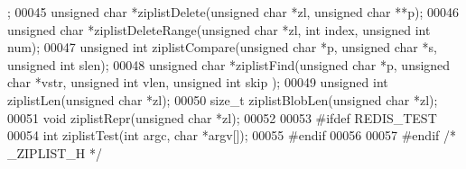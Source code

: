 \begin{DoxyCode}
      ;
00045 \textcolor{keywordtype}{unsigned} \textcolor{keywordtype}{char} *ziplistDelete(\textcolor{keywordtype}{unsigned} \textcolor{keywordtype}{char} *zl, \textcolor{keywordtype}{unsigned} \textcolor{keywordtype}{char} **p);
00046 \textcolor{keywordtype}{unsigned} \textcolor{keywordtype}{char} *ziplistDeleteRange(\textcolor{keywordtype}{unsigned} \textcolor{keywordtype}{char} *zl, \textcolor{keywordtype}{int} index, \textcolor{keywordtype}{unsigned} \textcolor{keywordtype}{int} num);
00047 \textcolor{keywordtype}{unsigned} \textcolor{keywordtype}{int} ziplistCompare(\textcolor{keywordtype}{unsigned} \textcolor{keywordtype}{char} *p, \textcolor{keywordtype}{unsigned} \textcolor{keywordtype}{char} *s, \textcolor{keywordtype}{unsigned} \textcolor{keywordtype}{int} slen);
00048 \textcolor{keywordtype}{unsigned} \textcolor{keywordtype}{char} *ziplistFind(\textcolor{keywordtype}{unsigned} \textcolor{keywordtype}{char} *p, \textcolor{keywordtype}{unsigned} \textcolor{keywordtype}{char} *vstr, \textcolor{keywordtype}{unsigned} \textcolor{keywordtype}{int} vlen, \textcolor{keywordtype}{unsigned} \textcolor{keywordtype}{int} skip
      );
00049 \textcolor{keywordtype}{unsigned} \textcolor{keywordtype}{int} ziplistLen(\textcolor{keywordtype}{unsigned} \textcolor{keywordtype}{char} *zl);
00050 size\_t ziplistBlobLen(\textcolor{keywordtype}{unsigned} \textcolor{keywordtype}{char} *zl);
00051 \textcolor{keywordtype}{void} ziplistRepr(\textcolor{keywordtype}{unsigned} \textcolor{keywordtype}{char} *zl);
00052 
00053 \textcolor{preprocessor}{#}\textcolor{preprocessor}{ifdef} \textcolor{preprocessor}{REDIS\_TEST}
00054 \textcolor{keywordtype}{int} ziplistTest(\textcolor{keywordtype}{int} argc, \textcolor{keywordtype}{char} *argv[]);
00055 \textcolor{preprocessor}{#}\textcolor{preprocessor}{endif}
00056 
00057 \textcolor{preprocessor}{#}\textcolor{preprocessor}{endif} \textcolor{comment}{/* \_ZIPLIST\_H */}
\end{DoxyCode}
